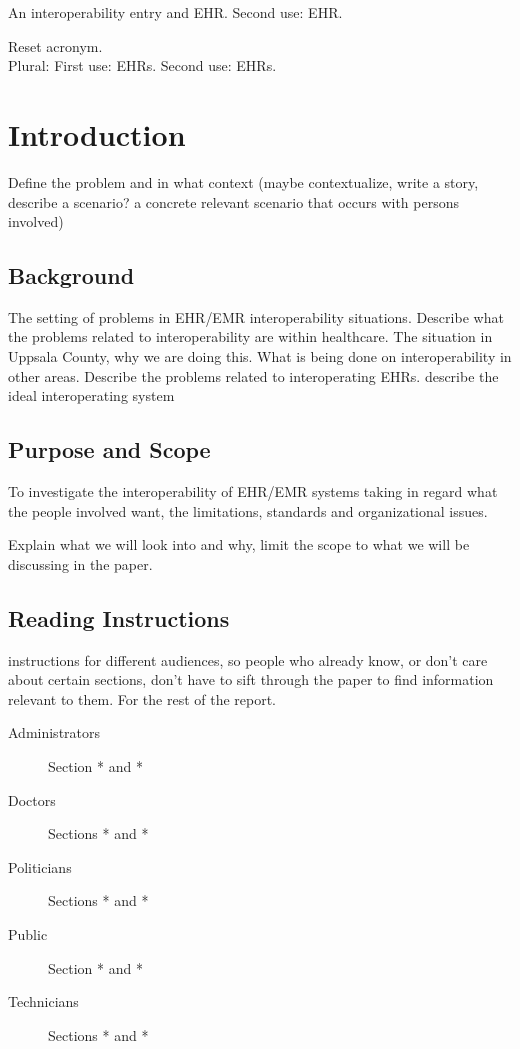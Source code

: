 \documentclass[14pt]{article}
\begin{document}
An \gls{interoperability} entry and \gls{EHR}. Second use: \gls{EHR}.

Reset acronym. \\
Plural: First use: \glspl{EHR}. Second use: \glspl{EHR}.

\newpage

\section{Introduction}
Define the problem and in what context (maybe contextualize, write a story, describe a scenario? a concrete relevant scenario that occurs with persons involved)


\subsection{Background}

The setting of problems in \gls{EHR}/EMR \gls{interoperability} situations. Describe what the problems related to \gls{interoperability} are within healthcare. The situation in Uppsala County, why we are doing this. What is being done on \gls{interoperability} in other areas. Describe the problems related to interoperating \glspl{EHR}.
describe the ideal interoperating system

\subsection{Purpose and Scope}
To investigate the \gls{interoperability} of
\gls{EHR}/EMR systems taking in regard what
the people involved want, the limitations,
standards and organizational issues.

Explain what we will look into and why, limit the scope to what we will be discussing in the paper.

\subsection{Reading Instructions}
instructions for different audiences, so people who already know, or don't care about certain sections, don't have to sift through the paper to find information relevant to them. For the rest of the report.

\begin{description}
\item[Administrators] Section * and *
\item[Doctors] Sections * and *
\item[Politicians] Sections * and *
\item[Public] Section * and *
\item[Technicians] Sections * and *
\end{description}
\end{document}
